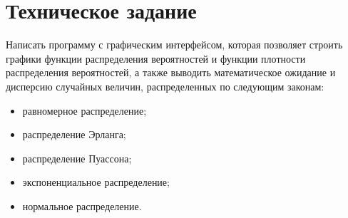 \chapter{Техническое задание}

Написать программу с графическим интерфейсом, которая позволяет строить графики функции распределения вероятностей и функции плотности распределения вероятностей, а также выводить математическое ожидание и дисперсию случайных величин, распределенных по следующим законам:

\begin{itemize}
	\item равномерное распределение;
	\item распределение Эрланга;
	\item распределение Пуассона;
	\item экспоненциальное распределение;
	\item нормальное распределение.
\end{itemize}
